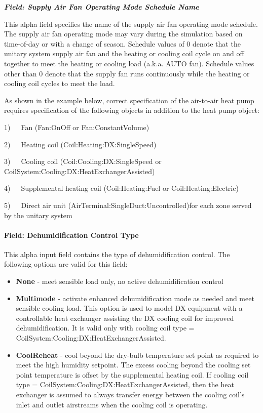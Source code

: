 \textbf{\emph{Field: Supply Air Fan Operating Mode Schedule Name}}

This alpha field specifies the name of the supply air fan operating mode schedule. The supply air fan operating mode may vary during the simulation based on time-of-day or with a change of season. Schedule values of 0 denote that the unitary system supply air fan and the heating or cooling coil cycle on and off together to meet the heating or cooling load (a.k.a. AUTO fan). Schedule values other than 0 denote that the supply fan runs continuously while the heating or cooling coil cycles to meet the load.

As shown in the example below, correct specification of the air-to-air heat pump requires specification of the following objects in addition to the heat pump object:

1)~~~Fan (Fan:OnOff or Fan:ConstantVolume)

2)~~~Heating coil (Coil:Heating:DX:SingleSpeed)

3)~~~Cooling coil (Coil:Cooling:DX:SingleSpeed or CoilSystem:Cooling:DX:HeatExchangerAssisted)

4)~~~Supplemental heating coil (Coil:Heating:Fuel or Coil:Heating:Electric)

5)~~~Direct air unit (AirTerminal:SingleDuct:Uncontrolled)for each zone served by the unitary system

\paragraph{Field: Dehumidification Control Type}\label{field-dehumidification-control-type-3-000}

This alpha input field contains the type of dehumidification control. The following options are valid for this field:

\begin{itemize}
\item
  \textbf{None} - meet sensible load only, no active dehumidification control
\item
  \textbf{Multimode} - activate enhanced dehumidification mode as needed and meet sensible cooling load. This option is used to model DX equipment with a controllable heat exchanger assisting the DX cooling coil for improved dehumidification. It is valid only with cooling coil type = CoilSystem:Cooling:DX:HeatExchangerAssisted.
\item
  \textbf{CoolReheat} - cool beyond the dry-bulb temperature set point as required to meet the high humidity setpoint. The excess cooling beyond the cooling set point temperature is offset by the supplemental heating coil. If cooling coil type = CoilSystem:Cooling:DX:HeatExchangerAssisted, then the heat exchanger is assumed to always transfer energy between the cooling coil's inlet and outlet airstreams when the cooling coil is operating.
\end{itemize}

